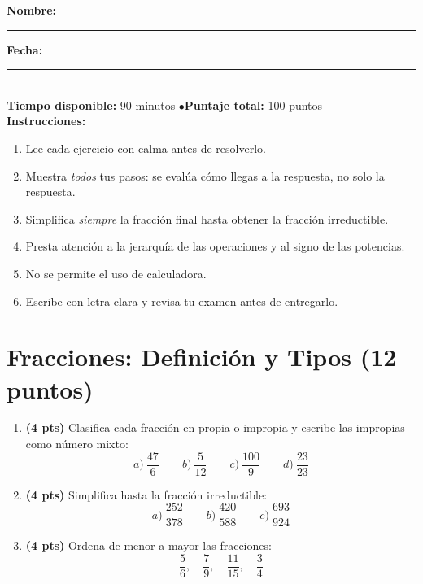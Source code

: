 \documentclass[12pt, letterpaper]{article}
\begin{document}


\vspace{4pt}
\begin{cuadroinfo}
  \small
  \textbf{Nombre:} \rule{0.55\linewidth}{0.4pt} \quad \textbf{Fecha:} \rule{0.15\linewidth}{0.4pt} \\[6pt]
  \textbf{Tiempo disponible:} 90 minutos \quad$\bullet$\quad \textbf{Puntaje total:} 100 puntos \\[4pt]
  \textbf{Instrucciones:}
  \begin{enumerate}[leftmargin=*]
    \item Lee cada ejercicio con calma antes de resolverlo.
    \item Muestra \emph{todos} tus pasos: se evalúa cómo llegas a la respuesta, no solo la respuesta.
    \item Simplifica \emph{siempre} la fracción final hasta obtener la fracción irreductible.
    \item Presta atención a la jerarquía de las operaciones y al signo de las potencias.
    \item No se permite el uso de calculadora.
    \item Escribe con letra clara y revisa tu examen antes de entregarlo.
  \end{enumerate}
\end{cuadroinfo}

\vspace{8pt}

\section{Fracciones: Definición y Tipos (12 puntos)}

\begin{enumerate}[leftmargin=*]
  \item \textbf{(4 pts)} Clasifica cada fracción en propia o impropia y escribe las impropias como número mixto:
        \[
          a)\ \frac{47}{6} \qquad b)\ \frac{5}{12} \qquad c)\ \frac{100}{9} \qquad d)\ \frac{23}{23}
        \]

  \item \textbf{(4 pts)} Simplifica hasta la fracción irreductible:
        \[
          a)\ \frac{252}{378} \qquad b)\ \frac{420}{588} \qquad c)\ \frac{693}{924}
        \]

  \item \textbf{(4 pts)} Ordena de menor a mayor las fracciones:
        \[
          \frac{5}{6}, \quad \frac{7}{9}, \quad \frac{11}{15}, \quad \frac{3}{4}
        \]
\end{enumerate}
\end{document}

